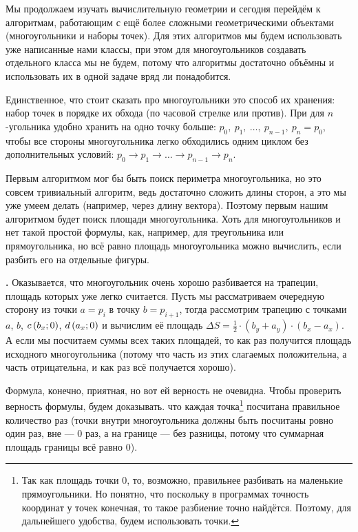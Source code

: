 Мы продолжаем изучать вычислительную геометрии и сегодня перейдём к алгоритмам, работающим с ещё более сложными геометрическими объектами (многоугольники и наборы точек). Для этих алгоритмов мы будем использовать уже написанные нами классы, при этом для многоугольников создавать отдельного класса мы не будем, потому что алгоритмы достаточно объёмны и использовать их в одной задаче вряд ли понадобится.

Единственное, что стоит сказать про многоугольники это способ их хранения: набор точек в порядке их обхода (по часовой стрелке или против). При для $n$-угольника удобно хранить на одно точку больше: $p_0,\ p_1,\ \ldots,\ p_{n - 1},\ p_n = p_0$, чтобы все стороны многоугольника легко обходились одним циклом без дополнительных условий: $p_0 \to p_1 \to \ldots \to p_{n - 1} \to p_n$.


Первым алгоритмом мог бы быть поиск периметра многоугольника, но это совсем тривиальный алгоритм, ведь достаточно сложить длины сторон, а это мы уже умеем делать (например, через длину вектора). Поэтому первым нашим алгоритмом будет поиск площади многоугольника. Хоть для многоугольников и нет такой простой формулы, как, например, для треугольника или прямоугольника, но всё равно площадь многоугольника можно вычислить, если разбить его на отдельные фигуры.

\textbf{.} Оказывается, что многоугольник очень хорошо разбивается на трапеции, площадь которых уже легко считается. Пусть мы рассматриваем очередную сторону из точки $a = p_i$ в точку $b = p_{i + 1}$, тогда рассмотрим трапецию с точками $a$, $b$, $c\left(b_x;0\right)$, $d\left(a_x;0\right)$ и вычислим её площадь $\Delta S = \frac{1}{2} \cdot (b_y + a_y) \cdot (b_x - a_x)$. А если мы посчитаем суммы всех таких площадей, то как раз получится площадь исходного многоугольника (потому что часть из этих слагаемых положительна, а часть отрицательна, и как раз всё получается хорошо).

Формула, конечно, приятная, но вот ей верность не очевидна. Чтобы проверить верность формулы, будем доказывать. что каждая точка\footnote{Так как площадь точки 0, то, возможно, правильнее разбивать на маленькие прямоугольники. Но понятно, что поскольку в программах точность координат у точек конечная, то такое разбиение точно найдётся. Поэтому, для дальнейшего удобства, будем использовать точки.} посчитана правильное количество раз (точки внутри многоугольника должны быть посчитаны ровно один раз, вне — 0 раз, а на границе — без разницы, потому что суммарная площадь границы всё равно 0).

